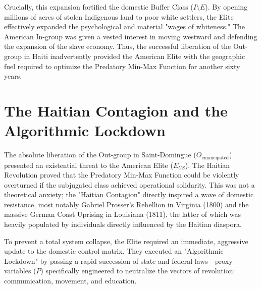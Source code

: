 \documentclass[12pt,openany]{book}
\begin{document}
Crucially, this expansion fortified the domestic Buffer Class ($I \setminus E$). By opening millions of acres of stolen Indigenous land to poor white settlers, the Elite effectively expanded the psychological and material "wages of whiteness." The American In-group was given a vested interest in moving westward and defending the expansion of the slave economy. Thus, the successful liberation of the Out-group in Haiti inadvertently provided the American Elite with the geographic fuel required to optimize the Predatory Min-Max Function for another sixty years.

\section{The Haitian Contagion and the Algorithmic Lockdown}

The absolute liberation of the Out-group in Saint-Domingue ($O_{\text{emancipated}}$) presented an existential threat to the American Elite ($E_{US}$). The Haitian Revolution proved that the Predatory Min-Max Function could be violently overturned if the subjugated class achieved operational solidarity. This was not a theoretical anxiety; the "Haitian Contagion" directly inspired a wave of domestic resistance, most notably Gabriel Prosser’s Rebellion in Virginia (1800) and the massive German Coast Uprising in Louisiana (1811), the latter of which was heavily populated by individuals directly influenced by the Haitian diaspora.

To prevent a total system collapse, the Elite required an immediate, aggressive update to the domestic control matrix. They executed an "Algorithmic Lockdown" by passing a rapid succession of state and federal laws—proxy variables ($P$) specifically engineered to neutralize the vectors of revolution: communication, movement, and education.
\end{document}
